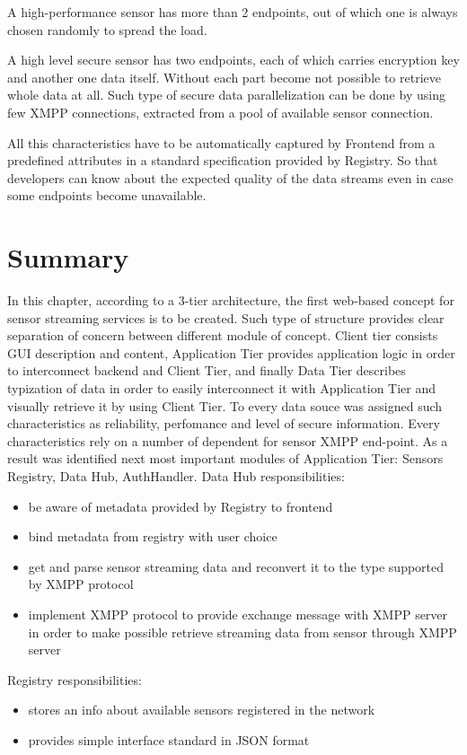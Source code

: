   A high-performance sensor has more than 2 endpoints, out of which one is always chosen randomly to spread the load. 

  A high level secure sensor has two endpoints, each of which carries encryption key and another one data itself. Without each part become not possible to retrieve whole data at all. Such type of secure data parallelization can be done by using few XMPP connections, extracted from a pool of available sensor connection.

 All this characteristics have to be automatically captured by Frontend from a predefined attributes in a standard specification provided by Registry. So that developers can know about the expected quality of the data streams even in case some endpoints become unavailable.

\section{Summary}
	In this chapter, according to a 3-tier architecture, the first web-based concept for sensor streaming services is to be created. Such type of structure provides clear separation of concern between different module of concept. Client tier consists GUI description and content, Application Tier provides application logic in order to interconnect backend and Client Tier, and finally Data Tier describes typization of data in order to easily interconnect it with Application Tier and visually retrieve it by using Client Tier. To every data souce was assigned such characteristics as reliability, perfomance and level of secure information. Every characteristics rely on a number of dependent for sensor XMPP end-point.
  As a result was identified next most important modules of Application Tier: Sensors Registry, Data Hub, AuthHandler. 
  Data Hub responsibilities:
  \begin{itemize}
  \item be aware of metadata provided by Registry to frontend
  \item bind metadata from registry with user choice
  \item get and parse sensor streaming data and reconvert it to the type supported by XMPP protocol
  \item implement XMPP protocol to provide exchange message with XMPP server in order to make possible retrieve streaming data from sensor through XMPP server
  \end{itemize}
  Registry responsibilities:
  \begin{itemize}
  \item stores an info about available sensors registered in the network
  \item provides simple interface standard in JSON format
  \end{itemize}
